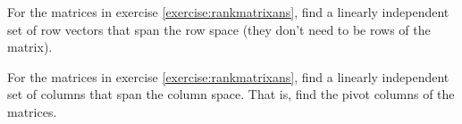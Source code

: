 \documentclass{ximera}
\begin{document}
\begin{exercise}%
    For the matrices in exercise \ref{exercise:rankmatrixans}, find a linearly independent set of row vectors that span the row space (they don't need to be rows of the matrix).
\end{exercise}

\begin{exercise}%
    For the matrices in exercise \ref{exercise:rankmatrixans}, find a linearly independent set of columns that span the column space. That is, find the pivot columns of the matrices.
\end{exercise}
\end{document}
